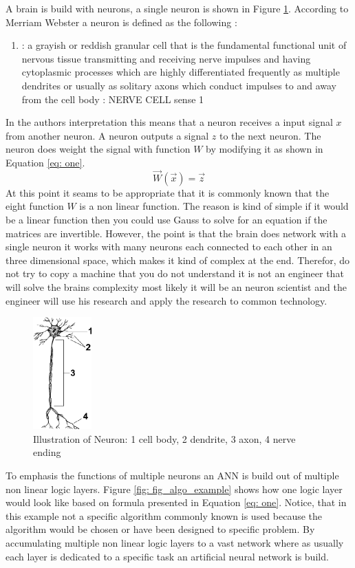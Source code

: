 \documentclass[conference]{IEEEtran}
\begin{document}
A brain is build with neurons, a single neuron is shown in Figure \ref{fig: neuron1}. According to Merriam Webster a neuron is defined as the following \cite{Neuron}:\\
\begin{enumerate}
	\item[] :  a grayish or reddish granular cell that is the fundamental functional unit of nervous tissue transmitting and receiving nerve impulses and having cytoplasmic processes which are highly differentiated frequently as multiple dendrites or usually as solitary axons which conduct impulses to and away from the cell body : NERVE CELL sense 1
\end{enumerate}
In the authors interpretation this means that a neuron receives a input signal $x$ from another neuron. A neuron outputs a signal $z$ to the next neuron. The neuron does weight the signal with function $W$ by modifying it as shown in Equation \ref{eq: one}.
\begin{equation}
\vec{W}(\vec{x})=\vec{z}\label{eq: one}
\end{equation}
At this point it seams to be appropriate that it is commonly known that the eight function $W$ is a non linear function. The reason is kind of simple if it would be a linear function then you could use Gauss to solve for an equation if the matrices are invertible. However, the point is that the brain does network with a single neuron it works with many neurons each connected to each other in an three dimensional space, which makes it kind of complex at the end.
Therefor, do not try to copy a machine that you do not understand it is not an engineer that will solve the brains complexity most likely it will be an neuron scientist and the engineer will use his research and apply the research to common technology.
\begin{figure}[htbp]
\centerline{\includegraphics[width=0.2\textwidth]{01_images/neuron1.PNG}}
\caption{Illustration of Neuron: 1 cell body, 2 dendrite, 3 axon, 4 nerve ending}
\label{fig: neuron1}
\end{figure}
To emphasis the functions of multiple neurons an ANN is build out of multiple non linear  logic layers. Figure \ref{fig: fig_algo_example} shows how one logic layer would look like based on formula presented in Equation \ref{eq: one}. Notice, that in this example not a specific algorithm commonly known is used because the algorithm would be chosen or have been designed to specific problem. By accumulating multiple non linear logic layers to a vast network where as usually each layer is dedicated to a specific task an artificial neural network is build.
\end{document}
